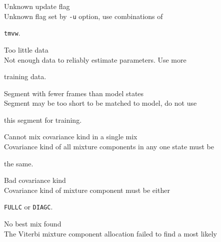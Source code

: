 \begin{itemize}
\begin{itemize}
\end{itemize}










\begin{itemize}


    Unknown update flag\\


        Unknown flag set by \texttt{-u} option, use combinations of 


        \texttt{tmvw}.





    Too little data\\


        Not enough data to reliably estimate parameters.  Use more 


        training data.





    Segment with fewer frames than model states\\


        Segment may be too short to be matched to model, do not use


        this segment for training.





    Cannot mix covariance kind in a single mix\\


        Covariance kind of all mixture components in any one state must be


        the same.





    Bad covariance kind\\


        Covariance kind of mixture component must be either


        \texttt{FULLC} or \texttt{DIAGC}.





    No best mix found\\


        The Viterbi mixture component allocation failed to find a most likely



\end{itemize}
\end{itemize}
